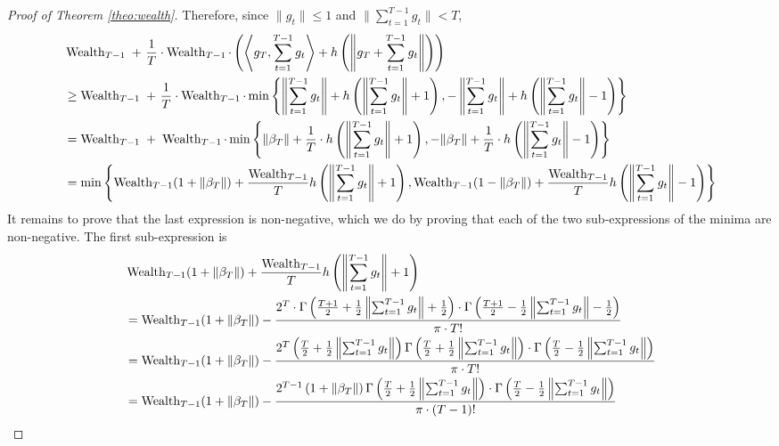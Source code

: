 \begin{proof}[Proof of Theorem \ref{theo:wealth}]
Therefore, since $\|g_t\| \le 1$ and $\|\sum_{t=1}^{T-1} g_t\| < T$,
\begin{align*}
& \operatorname{Wealth}_{T-1} \ + \ \frac{1}{T} \cdot \operatorname{Wealth}_{T-1} \cdot \left( \left\langle g_T, \sum_{t=1}^{T-1} g_t \right\rangle + h\left( \left\|g_T + \sum_{t=1}^{T-1} g_t \right\| \right) \right) \\
& \ge \operatorname{Wealth}_{T-1} \ + \ \frac{1}{T} \cdot \operatorname{Wealth}_{T-1} \cdot \min \left\{ \left\| \sum_{t=1}^{T-1} g_t \right\| + h\left( \left\|\sum_{t=1}^{T-1} g_t \right\| + 1 \right), - \left\| \sum_{t=1}^{T-1} g_t \right\| + h\left(\left\|\sum_{t=1}^{T-1} g_t \right\| - 1 \right) \right\} \\
& = \operatorname{Wealth}_{T-1} \ + \ \operatorname{Wealth}_{T-1} \cdot \min \left\{ \| \beta_T \| + \frac{1}{T} \cdot h\left( \left\|\sum_{t=1}^{T-1} g_t \right\| + 1 \right), - \|\beta_T\| + \frac{1}{T} \cdot h\left(\left\|\sum_{t=1}^{T-1} g_t \right\| - 1 \right) \right\} \\
& = \min \left\{ \operatorname{Wealth}_{T-1} (1 + \| \beta_T \|) + \frac{\operatorname{Wealth}_{T-1}}{T} h\left( \left\|\sum_{t=1}^{T-1} g_t \right\| + 1 \right), \operatorname{Wealth}_{T-1} (1 - \| \beta_T \|) + \frac{\operatorname{Wealth}_{T-1}}{T} h\left(\left\|\sum_{t=1}^{T-1} g_t \right\| - 1 \right) \right\}
\end{align*}
It remains to prove that the last expression is non-negative, which we do by
proving that each of the two sub-expressions of the minima are non-negative. The
first sub-expression is
\begin{align*}
& \Wealth_{T-1} (1 + \| \beta_T \|) + \frac{\Wealth_{T-1}}{T} h\left( \left\|\sum_{t=1}^{T-1} g_t \right\| + 1 \right) \\
& =  \Wealth_{T-1} (1 + \|\beta_T\|) - \frac{2^T \cdot \Gamma \left(\frac{T+1}{2} + \frac{1}{2}\left\|\sum_{t=1}^{T-1} g_t \right\| + \frac{1}{2} \right) \cdot \Gamma \left(\frac{T+1}{2} - \frac{1}{2} \left\|\sum_{t=1}^{T-1} g_t \right\| - \frac{1}{2} \right)}{\pi \cdot T!} \\
& =  \Wealth_{T-1} (1 + \|\beta_T\|) - \frac{2^T \left( \frac{T}{2} + \frac{1}{2} \left\|\sum_{t=1}^{T-1} g_t \right\| \right) \Gamma \left(\frac{T}{2} + \frac{1}{2}\left\|\sum_{t=1}^{T-1} g_t \right\| \right) \cdot \Gamma \left(\frac{T}{2} - \frac{1}{2} \left\|\sum_{t=1}^{T-1} g_t \right\| \right)}{\pi \cdot T!} \\
& =  \Wealth_{T-1} (1 + \|\beta_T\|) - \frac{2^{T-1} \left( 1 + \|\beta_T\| \right) \Gamma \left(\frac{T}{2} + \frac{1}{2}\left\|\sum_{t=1}^{T-1} g_t \right\| \right) \cdot \Gamma \left(\frac{T}{2} - \frac{1}{2} \left\|\sum_{t=1}^{T-1} g_t \right\| \right)}{\pi \cdot (T-1)!} \\

\end{align*}
\end{proof}
